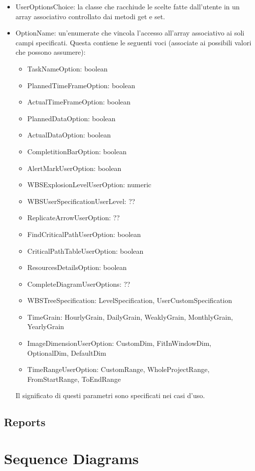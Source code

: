 \documentclass[a4paper, 12pt]{report}
\begin{document}
\begin{itemize}
	\item UserOptionsChoice: la classe che racchiude le scelte fatte dall'utente in un array associativo controllato dai metodi get e set.
	\item OptionName: un'enumerate che vincola l'accesso all'array associativo ai soli campi specificati. Questa contiene le seguenti voci (associate ai possibili valori che possono assumere):
	\begin{itemize}
		\item TaskNameOption: boolean		
		\item PlannedTimeFrameOption: boolean
		\item ActualTimeFrameOption: boolean
		\item PlannedDataOption: boolean
		\item ActualDataOption: boolean
		\item CompletitionBarOption: boolean
		\item AlertMarkUserOption: boolean
		\item WBSExplosionLevelUserOption: numeric
		\item WBSUserSpecificationUserLevel: ??
		\item ReplicateArrowUserOption: ??
		\item FindCriticalPathUserOption: boolean
		\item CriticalPathTableUserOption: boolean
		\item ResourcesDetailsOption: boolean
		\item CompleteDiagramUserOptions: ??
		\item WBSTreeSpecification: LevelSpecification, UserCustomSpecification
		\item TimeGrain: HourlyGrain, DailyGrain, WeaklyGrain, MonthlyGrain, YearlyGrain
		\item ImageDimensionUserOption: CustomDim, FitInWindowDim, OptionalDim, DefaultDim 
		\item TimeRangeUserOption: CustomRange, WholeProjectRange, FromStartRange, ToEndRange
	\end{itemize}
	Il significato di questi parametri sono specificati nei casi d'uso.
\end{itemize}
\section{Reports}
\chapter{Sequence Diagrams}
\end{document}
